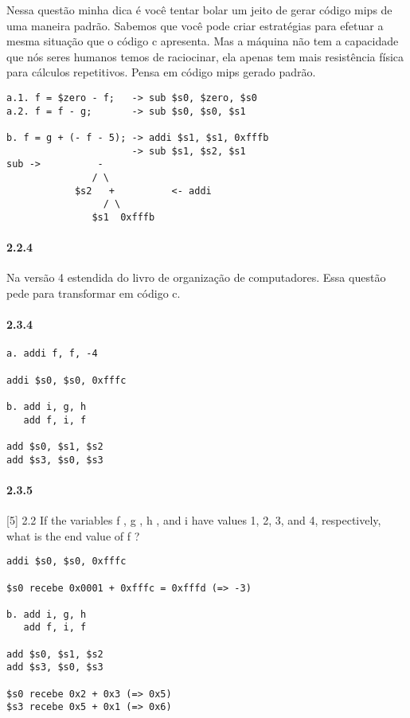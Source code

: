 \documentclass{article}
\begin{document}
Nessa questão minha dica é você tentar bolar um jeito de gerar código mips de
uma maneira padrão. Sabemos que você pode criar estratégias para efetuar a mesma
situação que o código c apresenta. Mas a máquina não tem a capacidade que nós
seres humanos temos de raciocinar, ela apenas tem mais resistência física para
cálculos repetitivos. Pensa em código mips gerado padrão.

\begin{verbatim}
a.1. f = $zero - f;   -> sub $s0, $zero, $s0
a.2. f = f - g;       -> sub $s0, $s0, $s1

b. f = g + (- f - 5); -> addi $s1, $s1, 0xfffb
                      -> sub $s1, $s2, $s1
sub ->          -
               / \
            $s2   +          <- addi
                 / \
               $s1  0xfffb
\end{verbatim}

\paragraph{2.2.4}

Na versão 4 estendida do livro de organização de computadores. Essa questão
pede para transformar em código c.

\paragraph{2.3.4}

\begin{verbatim}
a. addi f, f, -4

addi $s0, $s0, 0xfffc

b. add i, g, h
   add f, i, f

add $s0, $s1, $s2
add $s3, $s0, $s3
\end{verbatim}

\paragraph{2.3.5} [5] 2.2 If the variables f , g , h , and i have values 1, 2,
3, and 4, respectively, what is the end value of f ?

\begin{verbatim}
addi $s0, $s0, 0xfffc

$s0 recebe 0x0001 + 0xfffc = 0xfffd (=> -3)

b. add i, g, h
   add f, i, f

add $s0, $s1, $s2
add $s3, $s0, $s3

$s0 recebe 0x2 + 0x3 (=> 0x5)
$s3 recebe 0x5 + 0x1 (=> 0x6)

\end{verbatim}
\end{document}
